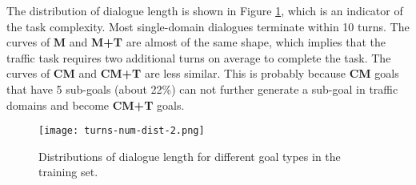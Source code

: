 The distribution of dialogue length is shown in Figure \ref{fig:turns_num_dist}, which is an indicator of the task complexity. Most single-domain dialogues terminate within 10 turns. The curves of \textbf{M} and \textbf{M+T} are almost of the same shape, which implies that the traffic task requires two additional turns on average to complete the task. The curves of \textbf{CM} and \textbf{CM+T} are less similar. This is probably because \textbf{CM} goals that have 5 sub-goals (about 22\%) can not further generate a sub-goal in traffic domains and become \textbf{CM+T} goals.

\begin{table}[t]
    \label{tab:5_type}
\end{table}

\begin{figure}[h]
    \texttt{[image: turns-num-dist-2.png]}
    \caption{Distributions of dialogue length for different goal types in the training set.}
    \label{fig:turns_num_dist}
\end{figure}

